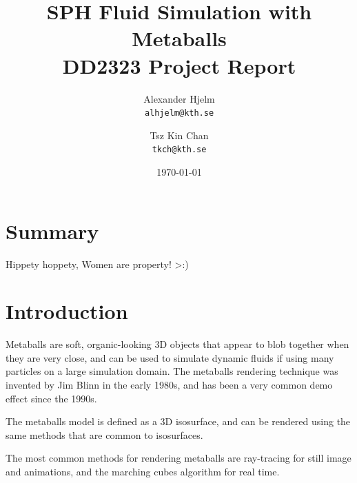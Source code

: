 \documentclass{article}
\begin{document}
    \title{%
    	\textbf{SPH Fluid Simulation with Metaballs} \\
    	\large DD2323 Project Report \\}
   
	\author{
		Alexander Hjelm\\
		\texttt{alhjelm@kth.se}
		\and
		Tsz Kin Chan\\
		\texttt{tkch@kth.se}
	}

    \date{\today}

    \maketitle
    
    \begin{multicols}{2}

    \section{Summary}
    Hippety hoppety, Women are property! >:)
    
    \section{Introduction}
    
    Metaballs are soft, organic-looking 3D objects that appear to blob together when they are very close, and can be used to simulate dynamic fluids if using many particles on a large simulation domain. 
    The metaballs rendering technique was invented by Jim Blinn in the early 1980s, and has been a very common demo effect since the 1990s.

    The metaballs model is defined as a 3D isosurface, and can be rendered using the same methods that are common to isosurfaces.

    The most common methods for rendering metaballs are ray-tracing for still image and animations, and the marching cubes algorithm for real time.
    \cite{heckbert92}


\end{multicols}
\end{document}
